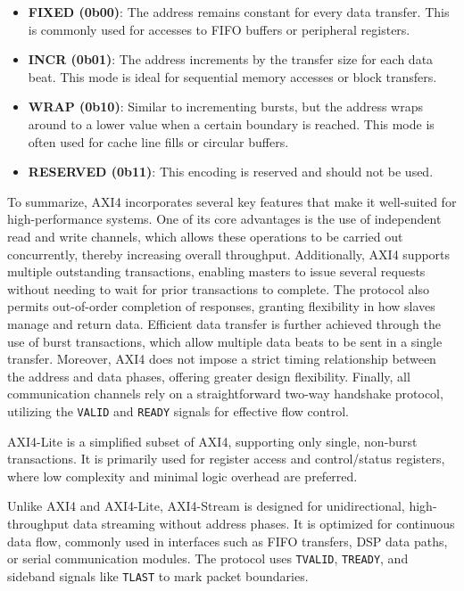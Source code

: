 \begin{itemize}
    \item \textbf{FIXED (0b00)}: The address remains constant for every data transfer. This is commonly used for accesses to FIFO buffers or peripheral registers.
    \item \textbf{INCR (0b01)}: The address increments by the transfer size for each data beat. This mode is ideal for sequential memory accesses or block transfers.
    \item \textbf{WRAP (0b10)}: Similar to incrementing bursts, but the address wraps around to a lower value when a certain boundary is reached. This mode is often used for cache line fills or circular buffers.
    \item \textbf{RESERVED (0b11)}: This encoding is reserved and should not be used.
\end{itemize}

To summarize, AXI4 incorporates several key features that make it well-suited for high-performance systems. One of its core advantages is the use of independent read and write channels, which allows these operations to be carried out concurrently, thereby increasing overall throughput. Additionally, AXI4 supports multiple outstanding transactions, enabling masters to issue several requests without needing to wait for prior transactions to complete. The protocol also permits out-of-order completion of responses, granting flexibility in how slaves manage and return data. Efficient data transfer is further achieved through the use of burst transactions, which allow multiple data beats to be sent in a single transfer. Moreover, AXI4 does not impose a strict timing relationship between the address and data phases, offering greater design flexibility. Finally, all communication channels rely on a straightforward two-way handshake protocol, utilizing the \texttt{VALID} and \texttt{READY} signals for effective flow control.

AXI4-Lite is a simplified subset of AXI4, supporting only single, non-burst transactions. It is primarily used for register access and control/status registers, where low complexity and minimal logic overhead are preferred.

Unlike AXI4 and AXI4-Lite, AXI4-Stream is designed for unidirectional, high-throughput data streaming without address phases. It is optimized for continuous data flow, commonly used in interfaces such as FIFO transfers, DSP data paths, or serial communication modules. The protocol uses \texttt{TVALID}, \texttt{TREADY}, and sideband signals like \texttt{TLAST} to mark packet boundaries.

